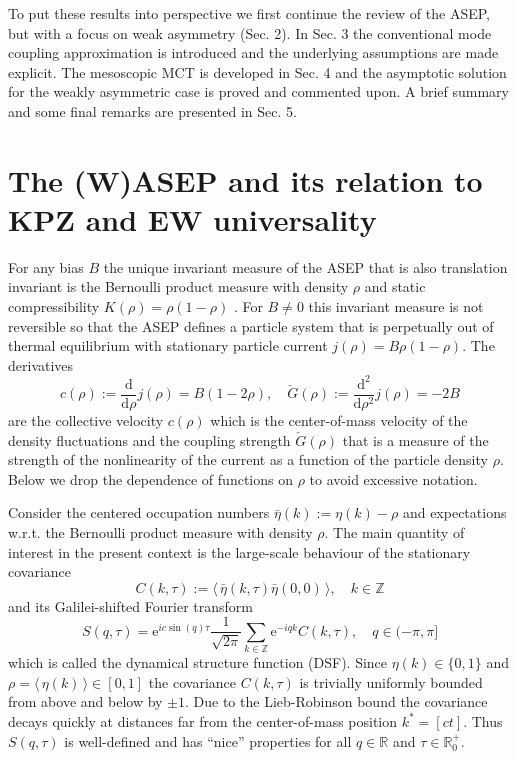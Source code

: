 \documentclass[12pt]{article}
\newcommand{\exval}[1]{\mbox{$\langle \, {#1}\, \rangle$}}
\newcommand{\rmd}{\mathrm{d}}
\newcommand{\rme}{\mathrm{e}}
\newcommand{\R}{{\mathbb R}}
\newcommand{\Z}{{\mathbb Z}}
\begin{document}
To put these results into perspective we first continue the review of 
the ASEP, but with a focus on weak asymmetry (Sec. 2). In Sec. 3
the conventional mode coupling approximation is introduced and the 
underlying assumptions are made explicit. The mesoscopic MCT is 
developed in Sec. 4 and the asymptotic solution for the weakly 
asymmetric case is proved and commented upon. A brief summary 
and some final remarks are presented in Sec. 5.


\section{The (W)ASEP and its relation to KPZ and EW universality}

For any bias $B$ the unique invariant measure of the ASEP that is
also translation invariant is the Bernoulli product measure with 
density $\rho$ and static compressibility $K(\rho) = \rho(1-\rho)$ 
\cite{Ligg99}. For $B\neq 0$ this invariant measure is not reversible 
so that the ASEP defines a particle system that is perpetually out of 
thermal equilibrium with stationary particle current $j(\rho) = B 
\rho(1-\rho)$. The derivatives
\begin{equation}
c(\rho) := \frac{\rmd}{\rmd \rho} j(\rho) = B (1-2\rho), \quad
\check{G}(\rho) := \frac{\rmd^2}{\rmd \rho^2} j(\rho) = -2 B
\label{ccheckGdef}
\end{equation}
are the collective velocity $c(\rho)$ which is the center-of-mass 
velocity of the density fluctuations \cite{Schu01} and the coupling 
strength $\check{G}(\rho)$ that is a measure of the strength of the 
nonlinearity of the current as a function of the particle density 
$\rho$. Below we drop
the dependence of functions on $\rho$ to avoid excessive notation.

Consider the centered occupation numbers $\bar{\eta}(k) := 
\eta(k) - \rho$ and expectations w.r.t. the Bernoulli product measure 
with density $\rho$. The main quantity of interest in the present 
context is the large-scale behaviour of the stationary covariance
\begin{equation}
C(k,\tau) := \exval{\bar{\eta}(k,\tau)\bar{\eta}(0,0)}, \quad k\in\Z
\label{Covktaudef}
\end{equation}
and its Galilei-shifted Fourier transform
\begin{equation}
S(q,\tau) = \rme^{i c \sin{(q)}\tau} \frac{1}{\sqrt{2\pi}} 
\sum_{k\in\Z} \rme^{-iq k} C(k,\tau), \quad q \in (-\pi,\pi] 
\label{DSFqtaudef}
\end{equation}
which is called the dynamical structure function (DSF). 
Since $\eta(k)\in\{0,1\}$ and $\rho = \exval{\eta(k)} \in [0,1]$ the 
covariance $C(k,\tau)$ is trivially uniformly bounded from above 
and below by $\pm1$. Due to the Lieb-Robinson bound \cite{Lieb72} 
the covariance decays quickly at distances far from the center-of-mass 
position $k^\ast = [ct]$. Thus $S(q,\tau)$ is well-defined and has 
``nice'' properties for all $q\in\R$ and $\tau\in\R_0^+$. 
\end{document}
